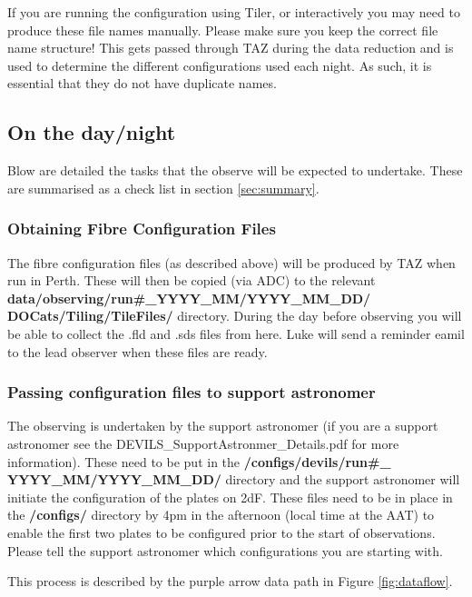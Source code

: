 \documentclass[12pt]{article}
\begin{document}
If you are running the configuration using Tiler, or interactively you may need to produce these file names manually. Please make sure you keep the correct file name structure! This gets passed through TAZ during the data reduction and is used to determine the different configurations used each night. As such, it is essential that they do not have duplicate names.  



\subsection{On the day/night}

Blow are detailed the tasks that the observe will be expected to undertake. These are summarised as a check list in section \ref{sec:summary}.

\subsubsection{Obtaining Fibre Configuration Files}

The fibre configuration files (as described above) will be produced by TAZ when run in Perth. These will then be copied (via ADC) to the relevant \textbf{data/observing/run\#\_YYYY\_MM/YYYY\_MM\_DD/ \\
DOCats/Tiling/TileFiles/} directory. During the day before observing you will be able to collect the .fld and .sds files from here. Luke will send a reminder eamil to the lead observer when these files are ready. 

\subsubsection{Passing configuration files to support astronomer}

The observing is undertaken by the support astronomer (if you are a support astronomer see the DEVILS\_SupportAstronmer\_Details.pdf for more information). These need to be put in the \textbf{/configs/devils/run\#\_
YYYY\_MM/YYYY\_MM\_DD/} directory and the support astronomer will initiate the configuration of the plates on 2dF. These files need to be in place in the \textbf{/configs/} directory by 4pm in the afternoon (local time at the AAT) to enable the first two plates to be configured prior to the start of observations. Please tell the support astronomer which configurations you are starting with.  

This process is described by the purple arrow data path in Figure \ref{fig:dataflow}. 
\end{document}
